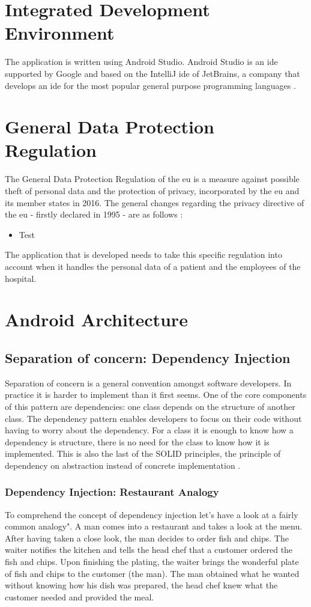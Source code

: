 \section{Integrated Development Environment}
The application is written using Android Studio. Android Studio is an \acrshort{ide} supported by Google and based on the IntelliJ \acrshort{ide} of JetBrains, a company that develops an \acrshort{ide} for the most popular general purpose programming languages \cite{AndroidDevelopers2019c}.
\section{General Data Protection Regulation}
The General Data Protection Regulation of the \acrfull{eu} is a measure against possible theft of personal data and the protection of privacy, incorporated by the \acrshort{eu} and its member states in 2016. The general changes regarding the privacy directive of the \acrshort{eu} - firstly declared in 1995 - are as follows \cite{THEEUROPEANPARLIAMENTANDTHECOUNCILOF1995} \cite{EUGDPRPortal:byTrunomi2019}:
\begin{itemize}
\item Test
\end{itemize}

The application that is developed needs to take this specific regulation into account when it handles the personal data of a patient and the employees of the hospital. 
\section{Android Architecture}
\subsection{Separation of concern: Dependency Injection}
Separation of concern is a general convention amongst software developers. In practice it is harder to implement than it first seems. One of the core components of this pattern are dependencies: one class depends on the structure of another class. The dependency pattern enables developers to focus on their code without having to worry about the dependency. For a class it is enough to know how a dependency is structure, there is no need for the class to know how it is implemented. This is also the last of the SOLID principles, the principle of dependency on abstraction instead of concrete implementation \cite{BhavyaKaria2018}.
\subsubsection{Dependency Injection: Restaurant Analogy}
To comprehend the concept of dependency injection let's have a look at a fairly common analogy". A man comes into a restaurant and takes a look at the menu. After having taken a close look, the man decides to order fish and chips. The waiter notifies the kitchen and tells the head chef that a customer ordered the fish and chips. Upon finishing the plating, the waiter brings the wonderful plate of fish and chips to the customer (the man). The man obtained what he wanted without knowing how his dish was prepared, the head chef knew what the customer needed and provided the meal.
